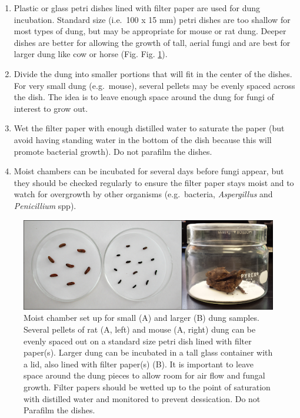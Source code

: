 \documentclass[]{book}
\providecommand{\tightlist}{%
  \setlength{\itemsep}{0pt}\setlength{\parskip}{0pt}}
\begin{document}
\begin{enumerate}
\def\labelenumi{\arabic{enumi}.}
\tightlist
\item
  Plastic or glass petri dishes lined with filter paper are used for dung incubation. Standard size (i.e.~100 x 15 mm) petri dishes are too shallow for most types of dung, but may be appropriate for mouse or rat dung. Deeper dishes are better for allowing the growth of tall, aerial fungi and are best for larger dung like cow or horse (Fig. Fig. \ref{fig:ch2fig3}).
\item
  Divide the dung into smaller portions that will fit in the center of the dishes. For very small dung (e.g.~mouse), several pellets may be evenly spaced across the dish. The idea is to leave enough space around the dung for fungi of interest to grow out.
\item
  Wet the filter paper with enough distilled water to saturate the paper (but avoid having standing water in the bottom of the dish because this will promote bacterial growth). Do not parafilm the dishes.
\item
  Moist chambers can be incubated for several days before fungi appear, but they should be checked regularly to ensure the filter paper stays moist and to watch for overgrowth by other organisms (e.g.~bacteria, \emph{Aspergillus} and \emph{Penicillium} spp).
\end{enumerate}

\begin{figure}

{\centering \includegraphics[width=6.83in]{img/Ch2_Fig3} 

}

\caption{Moist chamber set up for small (A) and larger (B) dung samples.  Several pellets of rat (A, left) and mouse (A, right) dung can be evenly spaced out on a standard size petri dish lined with filter paper(s).  Larger dung can be incubated in a tall glass container with a lid, also lined with filter paper(s) (B).  It is important to leave space around the dung pieces to allow room for air flow and fungal growth.  Filter papers should be wetted up to the point of saturation with distilled water and monitored to prevent dessication.  Do not Parafilm the dishes.}\label{fig:ch2fig3}
\end{figure}
\end{document}
